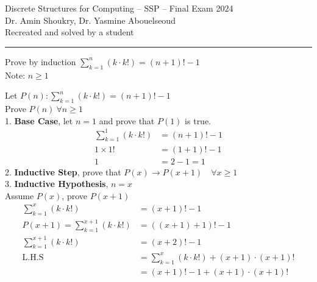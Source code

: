 \documentclass[answers]{exam}
\newcommand{\normalfontsize}{\fontsize{14pt}{16pt}\selectfont}
\newcommand{\titlefontsize}{\fontsize{16pt}{20pt}\selectfont}
\begin{document}
\noindent
\titlefontsize Discrete Structures for Computing -- SSP -- Final Exam 2024\\
\normalfontsize Dr. Amin Shoukry, Dr. Yasmine Abouelseoud\\Recreated and solved by a student
\hrule
\begin{questions}
    \question Prove by induction $\sum \limits_{k = 1}^{n} (k \cdot k!) = (n + 1)! - 1$\\ Note: $n \ge 1$
    
        \begin{solutionorbox}[19cm]
            Let $P(n): \sum \limits_{k = 1}^{n} (k \cdot k!) = (n + 1)! - 1$\\[+.7em]
            Prove $P(n) ~ \forall n \ge 1 $\\
            1. \textbf{Base Case}, let $n = 1$ and prove that $P(1)$ is true.
            \begin{align*}
                \sum \limits_{k = 1}^{1} (k \cdot k!) & = (n + 1)! - 1 \tag{Base Case} \\
                1 \times 1!                           & = (1+1)! - 1 \tag{Substitute}  \\
                1                                     & = 2 - 1 = 1 \tag{Proven}
            \end{align*}
            2. \textbf{Inductive Step}, prove that $P(x) \rightarrow P(x+1) \quad \forall x \ge 1$\\
            3. \textbf{Inductive Hypothesis}, $n = x$\\
            Assume $P(x)$, prove $P(x+1)$
            \begin{align*}
                \sum \limits_{k = 1}^{x} (k \cdot k!)            & = (x + 1)! - 1 \tag{Assume $P(x)$}                                               \\
                P(x+1) = \sum \limits_{k = 1}^{x+1} (k \cdot k!) & = ((x + 1) + 1)! -1 \tag{R.T.P $P(x+1)$}                                         \\
                \sum \limits_{k = 1}^{x+1} (k \cdot k!)          & = (x + 2)! -1 \tag{Simplify}                                                     \\
                \text{L.H.S}                                     & = \sum \limits_{k = 1}^{x} (k \cdot k!) + (x+1) \cdot (x+1)! \tag{Expand Series} \\
                                                                 & = (x + 1)! - 1 + (x+1) \cdot (x+1)! \tag{Sub. from $P(x)$}                       \\

\end{align*}
\end{solutionorbox}
\end{questions}
\end{document}
